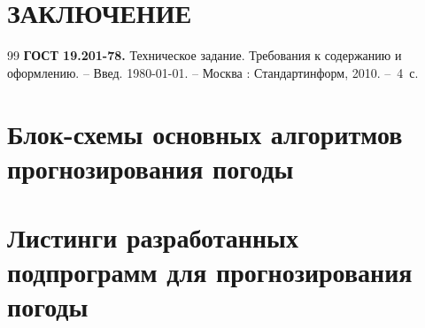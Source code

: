\documentclass[14pt]{extarticle}
\begin{document}
\section*[ЗАКЛЮЧЕНИЕ]{ЗАКЛЮЧЕНИЕ}
\lipsum[51-60]

\newpage
\renewcommand{\refname}{\rubibliographyname} %
{}%
\begin{thebibliography}{99}
	\textbf{ГОСТ 19.201-78.} Техническое задание. Требования к содержанию и оформлению.  -- Введ. 1980-01-01. -- Москва : Стандартинформ, 2010. --~4~с.
\end{thebibliography}

\appendix

\section{Блок-схемы основных алгоритмов прогнозирования погоды}
\lipsum[1-10]
\section{Листинги разработанных подпрограмм для прогнозирования погоды}
\lipsum[11-20]
\end{document}
